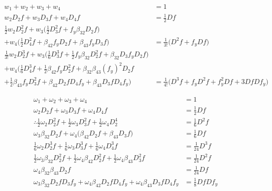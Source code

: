 \documentclass[12 pt]{article}
\begin{document}
\begin{align*}
	w_{1} + w_{2} + w_{3} + w_{4} &= 1\\
	w_{2}D_{2}f + w_{3}D_{3}f + w_{4}D_{4}f&= \frac{1}{2}Df\\
	\frac{1}{2}w_{2}D_{2}^{2}f + w_{3}\bigg(\frac{1}{2}D_{3}^{2}f + f_{y}\beta_{32}D_{2}f\bigg) & \\
	+ w_{4}\bigg(\frac{1}{2}D_{4}^{2}f + \beta_{42}f_{y}D_{2}f + \beta_{43}f_{y}D_{3}f\bigg) &= \frac{1}{3!}\bigg(D^{2}f+f_{y}Df\bigg)\\
	\frac{1}{3!}w_{2}D_{2}^{3}f + w_{3}\bigg(\frac{1}{6}D_{3}^{3}f + \frac{1}{2}f_{y}\beta_{32}D_{2}^{2}f + \beta_{32}D_{3}f_{y}D_{2}f\bigg) & \\
	+w_{4}\bigg(\frac{1}{6}D^{3}_{4}f + \frac{1}{2}\beta_{42}f_{y}D_{2}^{2}f+ \beta_{32}\beta_{43}(f_{y})^{2}D_{2}f & \\
	+ \frac{1}{2}\beta_{43}f_{y}D_{3}^{2}f + \beta_{42}D_{2}fD_{4}f_{y}	+ \beta_{43}D_{3}fD_{4}f_{y}\bigg) &= \frac{1}{4!}\bigg(D^{3}f + f_{y}D^{2}f + f_{y}^{2}Df + 3DfDf_{y}\bigg)
\end{align*}

\begin{align*}
\omega_{1} + \omega_{2} + \omega_{3} + \omega_{4} &= 1\\
\omega_{2}D_{2}f + \omega_{3}D_{3}f + \omega_{4}D_{4}f &= \frac{1}{2}Df\\
\therefore 
\frac{1}{2}\omega_{2}D_{2}^{2}f + \frac{1}{2}\omega_{3}D_{3}^{2}f + \frac{1}{2}\omega_{4}D_{2}^{4}&= \frac{1}{6}D^{2}f\\
\omega_{3}\beta_{32}D_{2}f + \omega_{4}\bigg(\beta_{42}D_{2}f + \beta_{43}D_{3}f\bigg) &= \frac{1}{6}Df\\
\frac{1}{6}\omega_{2}D_{2}^{3}f + \frac{1}{6}\omega_{3}D_{3}^{3}f + \frac{1}{6}\omega_{4}D_{4}^{3}f &= \frac{1}{24}D^{3}f\\
\frac{1}{2}\omega_{3}\beta_{32}D_{2}^{2}f + \frac{1}{2}\omega_{4}\beta_{42}D_{2}^{2}f + \frac{1}{2}\omega_{4}\beta_{43}D_{3}^{2}f &= \frac{1}{24}D^{2}f\\
\omega_{4}\beta_{32}\beta_{43}D_{2}f &= \frac{1}{24}Df\\
\omega_{3}\beta_{32}D_{2}fD_{3}f_{y} + \omega_{4}\beta_{42}D_{2}fD_{4}f_{y} + \omega_{4}\beta_{43}D_{3}fD_{4}f_{y} &= \frac{1}{8}DfDf_{y}
\end{align*}
\end{document}
